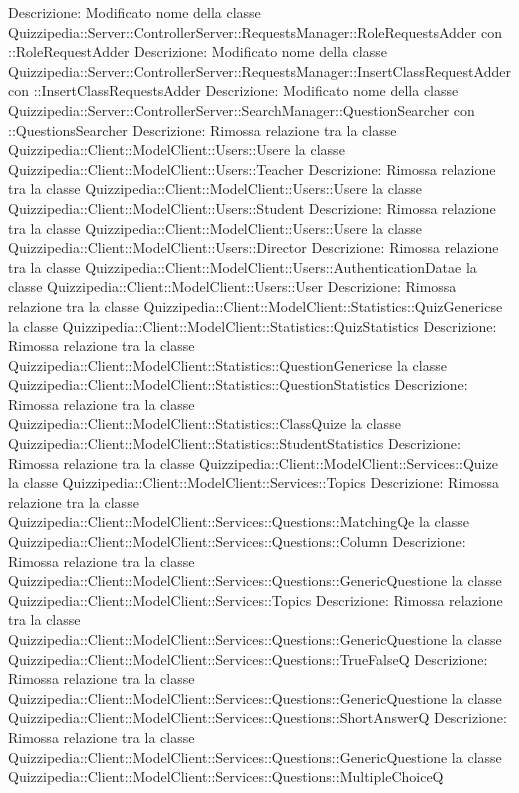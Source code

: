 Descrizione: Modificato nome della classe Quizzipedia::Server::ControllerServer::RequestsManager::RoleRequestsAdder con ::RoleRequestAdder 
Descrizione: Modificato nome della classe Quizzipedia::Server::ControllerServer::RequestsManager::InsertClassRequestAdder con ::InsertClassRequestsAdder 
Descrizione: Modificato nome della classe Quizzipedia::Server::ControllerServer::SearchManager::QuestionSearcher con ::QuestionsSearcher 
Descrizione: Rimossa relazione tra la classe Quizzipedia::Client::ModelClient::Users::Usere la classe Quizzipedia::Client::ModelClient::Users::Teacher 
Descrizione: Rimossa relazione tra la classe Quizzipedia::Client::ModelClient::Users::Usere la classe Quizzipedia::Client::ModelClient::Users::Student 
Descrizione: Rimossa relazione tra la classe Quizzipedia::Client::ModelClient::Users::Usere la classe Quizzipedia::Client::ModelClient::Users::Director 
Descrizione: Rimossa relazione tra la classe Quizzipedia::Client::ModelClient::Users::AuthenticationDatae la classe Quizzipedia::Client::ModelClient::Users::User 
Descrizione: Rimossa relazione tra la classe Quizzipedia::Client::ModelClient::Statistics::QuizGenericse la classe Quizzipedia::Client::ModelClient::Statistics::QuizStatistics 
Descrizione: Rimossa relazione tra la classe Quizzipedia::Client::ModelClient::Statistics::QuestionGenericse la classe Quizzipedia::Client::ModelClient::Statistics::QuestionStatistics 
Descrizione: Rimossa relazione tra la classe Quizzipedia::Client::ModelClient::Statistics::ClassQuize la classe Quizzipedia::Client::ModelClient::Statistics::StudentStatistics 
Descrizione: Rimossa relazione tra la classe Quizzipedia::Client::ModelClient::Services::Quize la classe Quizzipedia::Client::ModelClient::Services::Topics 
Descrizione: Rimossa relazione tra la classe Quizzipedia::Client::ModelClient::Services::Questions::MatchingQe la classe Quizzipedia::Client::ModelClient::Services::Questions::Column 
Descrizione: Rimossa relazione tra la classe Quizzipedia::Client::ModelClient::Services::Questions::GenericQuestione la classe Quizzipedia::Client::ModelClient::Services::Topics 
Descrizione: Rimossa relazione tra la classe Quizzipedia::Client::ModelClient::Services::Questions::GenericQuestione la classe Quizzipedia::Client::ModelClient::Services::Questions::TrueFalseQ 
Descrizione: Rimossa relazione tra la classe Quizzipedia::Client::ModelClient::Services::Questions::GenericQuestione la classe Quizzipedia::Client::ModelClient::Services::Questions::ShortAnswerQ 
Descrizione: Rimossa relazione tra la classe Quizzipedia::Client::ModelClient::Services::Questions::GenericQuestione la classe Quizzipedia::Client::ModelClient::Services::Questions::MultipleChoiceQ 

